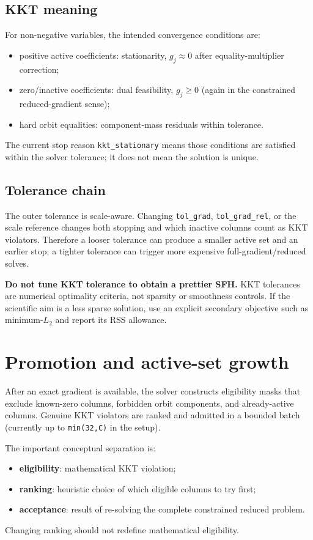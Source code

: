 \documentclass[10pt,a4paper]{article}
\newcommand{\code}[1]{\texttt{#1}}
\newenvironment{maintnote}{\begin{leftbar}\small\color{darkgray}}{\end{leftbar}}
\begin{document}
\subsection{KKT meaning}
For non-negative variables, the intended convergence conditions are:
\begin{itemize}
\item positive active coefficients: stationarity, $g_j\approx0$ after equality-multiplier correction;
\item zero/inactive coefficients: dual feasibility, $g_j\ge0$ (again in the constrained reduced-gradient sense);
\item hard orbit equalities: component-mass residuals within tolerance.
\end{itemize}
The current stop reason \code{kkt\_stationary} means those conditions are satisfied within the solver tolerance; it does not mean the solution is unique.

\subsection{Tolerance chain}
The outer tolerance is scale-aware. Changing \code{tol\_grad}, \code{tol\_grad\_rel}, or the scale reference changes both stopping and which inactive columns count as KKT violators. Therefore a looser tolerance can produce a smaller active set and an earlier stop; a tighter tolerance can trigger more expensive full-gradient/reduced solves.

\begin{maintnote}
\textbf{Do not tune KKT tolerance to obtain a prettier SFH.} KKT tolerances are numerical optimality criteria, not sparsity or smoothness controls. If the scientific aim is a less sparse solution, use an explicit secondary objective such as minimum-$L_2$ and report its RSS allowance.
\end{maintnote}

\section{Promotion and active-set growth}
After an exact gradient is available, the solver constructs eligibility masks that exclude known-zero columns, forbidden orbit components, and already-active columns. Genuine KKT violators are ranked and admitted in a bounded batch (currently up to \code{min(32,C)} in the setup).

The important conceptual separation is:
\begin{itemize}
\item \textbf{eligibility}: mathematical KKT violation;
\item \textbf{ranking}: heuristic choice of which eligible columns to try first;
\item \textbf{acceptance}: result of re-solving the complete constrained reduced problem.
\end{itemize}
Changing ranking should not redefine mathematical eligibility.
\end{document}
